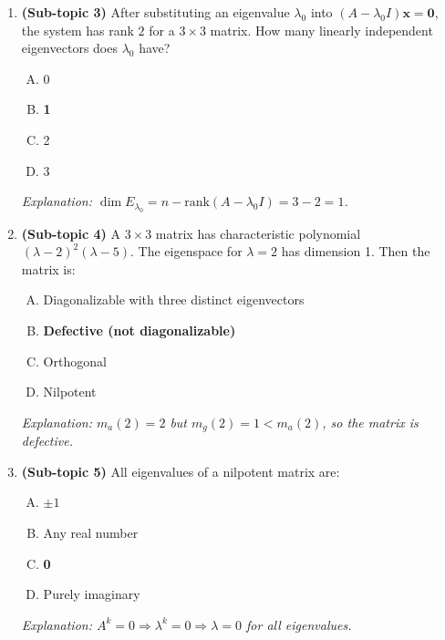 \documentclass[12pt,a4paper]{article}
\begin{document}
\begin{enumerate}
  \textit{Revised MCQ 2:} For a $4\times 4$ matrix, the characteristic polynomial $\det(A-\lambda I)$
  has degree:
  \begin{enumerate}[(A)]
    \item 2
    \item 3
    \item \textbf{4}
    \item 8
  \end{enumerate}
  \textit{Explanation: The characteristic polynomial of an $n\times n$ matrix always has degree $n$; here $n=4$.}

  \item \textbf{(Sub-topic 3)} After substituting an eigenvalue $\lambda_0$ into $(A-\lambda_0 I)\mathbf{x}=\mathbf{0}$,
  the system has rank $2$ for a $3\times 3$ matrix. How many linearly independent eigenvectors does $\lambda_0$ have?
  \begin{enumerate}[(A)]
    \item 0
    \item \textbf{1}
    \item 2
    \item 3
  \end{enumerate}
  \textit{Explanation: $\dim E_{\lambda_0} = n - \text{rank}(A-\lambda_0 I) = 3 - 2 = 1$.}

  \item \textbf{(Sub-topic 4)} A $3\times 3$ matrix has characteristic polynomial $(\lambda-2)^2(\lambda-5)$.
  The eigenspace for $\lambda=2$ has dimension 1. Then the matrix is:
  \begin{enumerate}[(A)]
    \item Diagonalizable with three distinct eigenvectors
    \item \textbf{Defective (not diagonalizable)}
    \item Orthogonal
    \item Nilpotent
  \end{enumerate}
  \textit{Explanation: $m_a(2)=2$ but $m_g(2)=1 < m_a(2)$, so the matrix is defective.}

  \item \textbf{(Sub-topic 5)} All eigenvalues of a nilpotent matrix are:
  \begin{enumerate}[(A)]
    \item $\pm 1$
    \item Any real number
    \item \textbf{0}
    \item Purely imaginary
  \end{enumerate}
  \textit{Explanation: $A^k=0 \Rightarrow \lambda^k=0 \Rightarrow \lambda=0$ for all eigenvalues.}


\end{enumerate}
\end{document}
